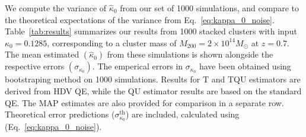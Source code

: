 \documentclass[prd, superscriptaddress, tightenlines, longbibliography, nofootinbib, eqsecnum, amsfonts, amsmath, floatfix, twocolumn, notitlepage]{revtex4-2}
\begin{document}
We compute the variance of $\hat \kappa_0$ from our set of 1000 simulations, and compare to the theoretical expectations of the variance from Eq.~\ref{eq:kappa_0_noise}.
Table~\ref{tab:results} summarizes our results from 1000 stacked clusters with input $\kappa_0 = 0.1285$, corresponding to a cluster mass of $M_{200} = 2 \times 10^{14} M_{\odot}$ at $z=0.7$. The mean estimated $(\hat \kappa_0)$ from these simulations is shown alongside the respective errors $(\sigma_{\kappa_0})$. The emperical errors in  $\sigma_{\kappa_0}$ have been obtained using bootstraping method on 1000 simulations. Results for T and TQU estimators are derived from HDV QE, while the QU estimator results are based on the standard QE. The MAP estimates are also provided for comparison in a separate row. Theoretical error predictions ($\sigma_{\kappa_0}^{\text{th}}$)  are included, calculated using (Eq.~\ref{eq:kappa_0_noise}).
\end{document}
